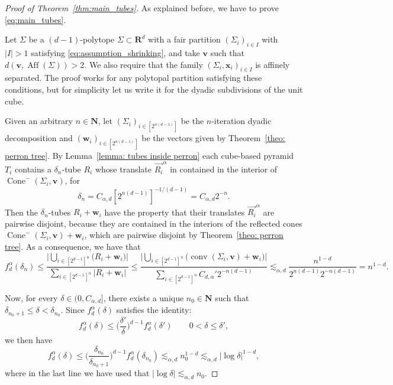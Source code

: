 \documentclass[10pt]{amsart}
\newcommand\translate[2]{\overrightarrow{#1}^{#2}}
\newcommand{\R}{\mathbf{R}}
\newcommand{\N}{\mathbf{N}}
\newcommand{\aff}{\operatorname{Aff}}
\newcommand{\ocone}[2]{\operatorname{Cone}^-(#1,#2)}
\begin{document}
\begin{proof}[Proof of Theorem~\ref{thm:main_tubes}]
As explained before, we have to prove \eqref{eq:main_tubes}.

Let $\Sigma$ be a $(d-1)$-polytope $\Sigma \subset \R^d$ with a fair partition $(\Sigma_i)_{i \in I}$ with $|I|>1$ satisfying \eqref{eq:assumption_shrinking}, and take $\mathbf{v}$ such that $d(\mathbf{v},\aff(\Sigma))>2$. We also require that the family $(\Sigma_i,\mathbf{x}_i)_{i \in I}$ is affinely separated. The proof works for any polytopal partition satisfying these conditions, but for simplicity let us write it for the dyadic subdivisions of the unit cube.

Given an arbitrary $n\in \N$, let $(\Sigma_i)_{i \in [2^{n(d-1)}]}$ be the $n$-iteration dyadic decomposition and $(\mathbf{w}_i)_{i \in [2^{n(d-1)}]}$ be the vectors given by Theorem~\ref{theo: perron tree}. By Lemma~\ref{lemma: tubes inside perron} each cube-based pyramid $T_i$ contains a $\delta_n$-tube $R_i$ whose translate $\translate{R_i}{\alpha}$ in contained in the interior of $\ocone{\Sigma_i}{\mathbf{v}}$, for
\[ \delta_n = C_{\alpha,d} [2^{n(d-1)}]^{-1/(d-1)} = C_{\alpha,d} 2^{-n}.\] Then the $\delta_n$-tubes $R_i + \mathbf{w}_i$ have the property that their translates $\translate{R_i}{\alpha}$ are pairwise disjoint, because they are contained in the interiors of the reflected cones $\ocone{\Sigma_i}{\mathbf{v}}+\mathbf{w}_i$, which are pairwise disjoint by Theorem~\ref{theo: perron tree}. 
As a consequence, we have that 
\begin{equation*}
    f^\alpha_d(\delta_n)\leq \frac{\bigg|\bigcup_{i\in [2^{d-1}]^n}\big(R_i+\mathbf{w}_i\big)\bigg|}{\sum_{i\in [2^{d-1}]^n}|R_i+\mathbf{w}_i|}\leq \frac{\bigg|\bigcup_{i\in [2^{d-1}]^n}\big(\operatorname{conv}(\Sigma_i,\mathbf{v})+\mathbf{w}_i\big)\bigg|}{\sum_{i\in [2^{d-1}]^n}C_{d,\alpha}'2^{-n(d-1)}}\lesssim_{\alpha,d} \frac{n^{1-d}}{2^{n(d-1)}2^{-n(d-1)}}=n^{1-d}.
\end{equation*}

Now, for every $\delta\in (0,C_{\alpha,d}]$, there exists a unique $n_0\in \N$ such that $\delta_{n_0+1}\leq \delta< \delta_{n_0}$. Since $f^\alpha_d(\delta)$ satisfies the identity:
\begin{equation*}
    f_d^\alpha(\delta)\leq \bigg(\frac{\delta'}{\delta}\bigg)^{d-1}f_d^\alpha(\delta')\qquad 0<\delta\leq \delta',
\end{equation*}
we then have
\begin{equation*}
    f_d^\alpha(\delta)\leq \bigg(\frac{\delta_{n_0}}{\delta_{n_0+1}}\bigg)^{d-1}f_d^\alpha(\delta_{n_0})\lesssim_{\alpha,d}n_0^{1-d}\lesssim_{\alpha,d}|\log\delta|^{1-d},
\end{equation*}
where in the last line we have used that $|\log\delta|\lesssim_{\alpha,d} n_0$.
\end{proof}
\end{document}
